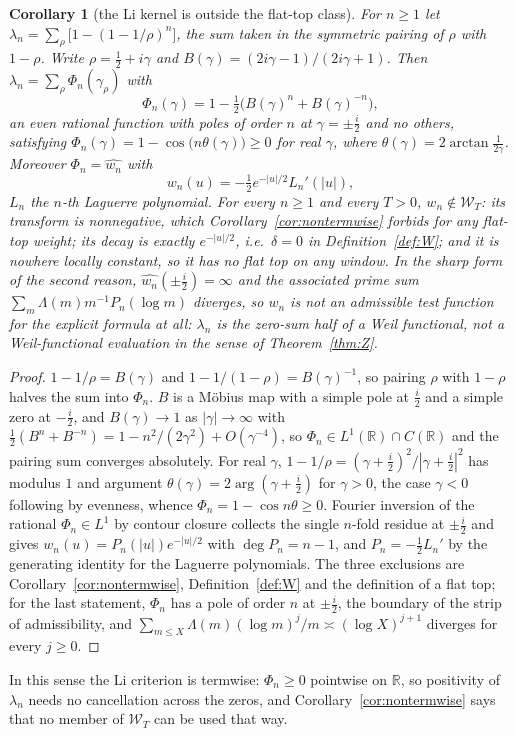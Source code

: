 \documentclass[11pt]{amsart}
\newtheorem{corollary}[theorem]{Corollary}
\theoremstyle{definition}
\theoremstyle{remark}
\newcommand{\R}{\mathbb R}
\newcommand{\Wcl}{\mathcal W_T}
\begin{document}
\begin{corollary}[the Li kernel is outside the flat-top class]\label{cor:Li}
For $n\ge1$ let $\lambda_n=\sum_\rho\big[1-(1-1/\rho)^n\big]$, the sum taken in the symmetric pairing
of $\rho$ with $1-\rho$. Write $\rho=\frac12+i\gamma$ and $B(\gamma)=(2i\gamma-1)/(2i\gamma+1)$. Then
$\lambda_n=\sum_\rho\Phi_n(\gamma_\rho)$ with
\[
\Phi_n(\gamma)=1-\tfrac12\big(B(\gamma)^n+B(\gamma)^{-n}\big),
\]
an even rational function with poles of order $n$ at $\gamma=\pm\frac i2$ and no others, satisfying
$\Phi_n(\gamma)=1-\cos\big(n\theta(\gamma)\big)\ge0$ for real $\gamma$, where
$\theta(\gamma)=2\arctan\frac1{2\gamma}$. Moreover $\Phi_n=\widehat{w_n}$ with
\[
w_n(u)=-\tfrac12e^{-|u|/2}L_n'(|u|),
\]
$L_n$ the $n$-th Laguerre polynomial. For every $n\ge1$ and every $T>0$, $w_n\notin\Wcl$: its transform
is nonnegative, which Corollary~\ref{cor:nontermwise} forbids for any flat-top weight; its decay is
exactly $e^{-|u|/2}$, i.e.\ $\delta=0$ in Definition~\ref{def:W}; and it is nowhere locally constant,
so it has no flat top on any window. In the sharp form of the second reason,
$\widehat{w_n}(\pm\frac i2)=\infty$ and the associated prime sum
$\sum_m\Lambda(m)m^{-1}P_n(\log m)$ diverges, so $w_n$ is not an admissible test function for the
explicit formula at all: $\lambda_n$ is the zero-sum half of a Weil functional, not a Weil-functional
evaluation in the sense of Theorem~\ref{thm:Z}.
\end{corollary}
\begin{proof}
$1-1/\rho=B(\gamma)$ and $1-1/(1-\rho)=B(\gamma)^{-1}$, so pairing $\rho$ with $1-\rho$ halves the sum
into $\Phi_n$. $B$ is a M\"obius map with a simple pole at $\frac i2$ and a simple zero at $-\frac i2$,
and $B(\gamma)\to1$ as $|\gamma|\to\infty$ with
$\frac12(B^n+B^{-n})=1-n^2/(2\gamma^2)+O(\gamma^{-4})$, so $\Phi_n\in L^1(\R)\cap C(\R)$ and the
pairing sum converges absolutely. For real $\gamma$, $1-1/\rho=(\gamma+\frac i2)^2/|\gamma+\frac i2|^2$
has modulus $1$ and argument $\theta(\gamma)=2\arg(\gamma+\frac i2)$ for $\gamma>0$, the case
$\gamma<0$ following by evenness, whence
$\Phi_n=1-\cos n\theta\ge0$. Fourier inversion of the rational $\Phi_n\in L^1$ by contour closure
collects the single $n$-fold residue at $\pm\frac i2$ and gives $w_n(u)=P_n(|u|)e^{-|u|/2}$ with
$\deg P_n=n-1$, and $P_n=-\frac12L_n'$ by the generating identity for the Laguerre polynomials. The
three exclusions are Corollary~\ref{cor:nontermwise}, Definition~\ref{def:W} and the definition of a
flat top; for the last statement, $\Phi_n$ has a pole of order $n$ at $\pm\frac i2$, the boundary of
the strip of admissibility, and $\sum_{m\le X}\Lambda(m)(\log m)^j/m\asymp(\log X)^{j+1}$ diverges for
every $j\ge0$.
\end{proof}
In this sense the Li criterion is termwise:
$\Phi_n\ge0$ pointwise on $\R$, so positivity of $\lambda_n$ needs no cancellation across the zeros,
and Corollary~\ref{cor:nontermwise} says that no member of $\Wcl$ can be used that way.
\end{document}
